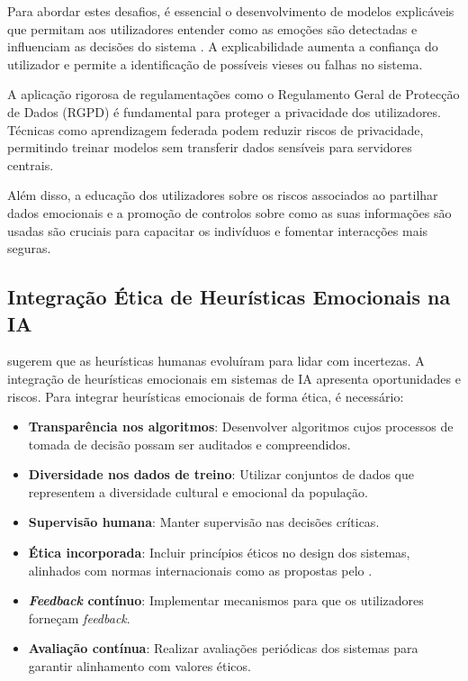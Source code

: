 \documentclass[a4paper,12pt]{report}
\begin{document}
	Para abordar estes desafios, é essencial o desenvolvimento de modelos explicáveis que permitam aos utilizadores entender como as emoções são detectadas e influenciam as decisões do sistema \parencite{russell2020}. A explicabilidade aumenta a confiança do utilizador e permite a identificação de possíveis vieses ou falhas no sistema.
	
	A aplicação rigorosa de regulamentações como o Regulamento Geral de Protecção de Dados (RGPD) é fundamental para proteger a privacidade dos utilizadores. Técnicas como aprendizagem federada podem reduzir riscos de privacidade, permitindo treinar modelos sem transferir dados sensíveis para servidores centrais.
	
	Além disso, a educação dos utilizadores sobre os riscos associados ao partilhar dados emocionais e a promoção de controlos sobre como as suas informações são usadas são cruciais para capacitar os indivíduos e fomentar interacções mais seguras.
	
	\subsection{Integração Ética de Heurísticas Emocionais na IA}
	
	\textcite{gigerenzer2009} sugerem que as heurísticas humanas evoluíram para lidar com incertezas. A integração de heurísticas emocionais em sistemas de IA apresenta oportunidades e riscos. Para integrar heurísticas emocionais de forma ética, é necessário:
	
	\begin{itemize}
		\item \textbf{Transparência nos algoritmos}: Desenvolver algoritmos cujos processos de tomada de decisão possam ser auditados e compreendidos.
		\item \textbf{Diversidade nos dados de treino}: Utilizar conjuntos de dados que representem a diversidade cultural e emocional da população.
		\item \textbf{Supervisão humana}: Manter supervisão nas decisões críticas.
		\item \textbf{Ética incorporada}: Incluir princípios éticos no design dos sistemas, alinhados com normas internacionais como as propostas pelo \textcite{ieee2019}.
		\item \textbf{\textit{Feedback} contínuo}: Implementar mecanismos para que os utilizadores forneçam \textit{feedback}.
		\item \textbf{Avaliação contínua}: Realizar avaliações periódicas dos sistemas para garantir alinhamento com valores éticos.
	\end{itemize}
	
\end{document}

